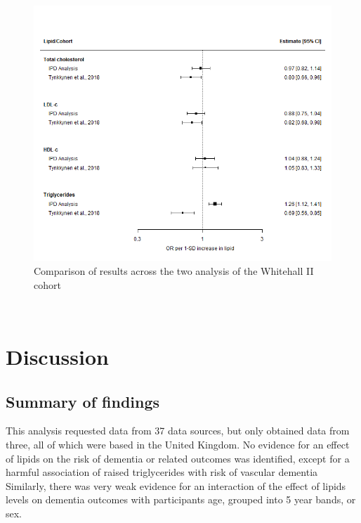 \documentclass[a4paper, twoside]{templates/ociamthesis}
\begin{document}
\begin{figure}[H]
\includegraphics[width=1\linewidth]{figures/ipd/whitehall_comparison} \caption[Comparison of results across the two analysis of the Whitehall II cohort]{Comparison of results across the two analysis of the Whitehall II cohort}\label{fig:whitehallComparison}
\end{figure}

~

\hypertarget{discussion-3}{%
\section{Discussion}\label{discussion-3}}

\hypertarget{summary-of-findings-2}{%
\subsection{Summary of findings}\label{summary-of-findings-2}}

This analysis requested data from 37 data sources, but only obtained data from three, all of which were based in the United Kingdom. No evidence for an effect of lipids on the risk of dementia or related outcomes was identified, except for a harmful association of raised triglycerides with risk of vascular dementia Similarly, there was very weak evidence for an interaction of the effect of lipids levels on dementia outcomes with participants age, grouped into 5 year bands, or sex.
\end{document}
